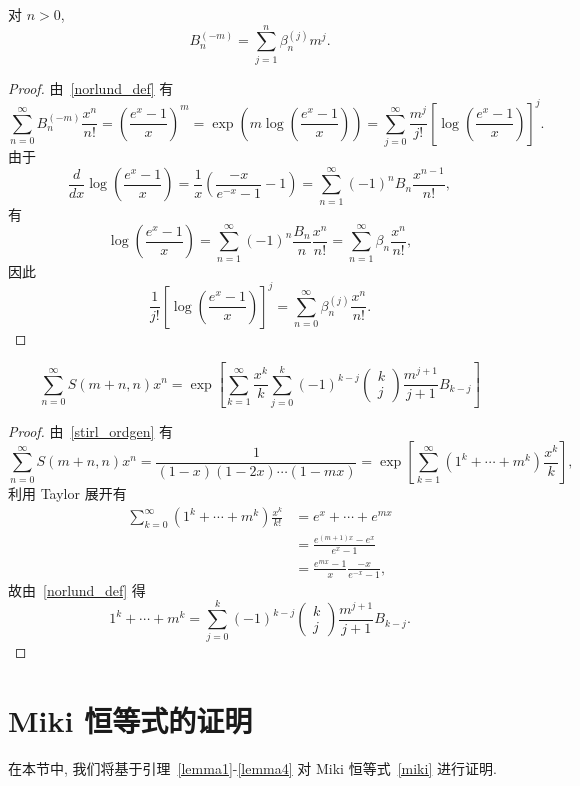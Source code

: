 \documentclass{CombPaper}
\begin{document}
\begin{lemma}\label{lemma3}
对 $n>0$, 
$$B_{n}^{(-m)}=\sum_{j=1}^{n} \beta_{n}^{(j)} m^{j}.$$
\end{lemma}
\begin{proof}
由~\eqref{norlund_def} 有
$$
\sum_{n=0}^{\infty} B_{n}^{(-m)} \frac{x^{n}}{n !}=\left(\frac{e^{x}-1}{x}\right)^{m}=\exp \left(m \log \left(\frac{e^{x}-1}{x}\right)\right)=\sum_{j=0}^{\infty} \frac{m^{j}}{j !}\left[\log \left(\frac{e^{x}-1}{x}\right)\right]^{j}.
$$
由于
$$
\frac{d}{d x} \log \left(\frac{e^{x}-1}{x}\right)=\frac{1}{x}\left(\frac{-x}{e^{-x}-1}-1\right)=\sum_{n=1}^{\infty}(-1)^{n} B_{n} \frac{x^{n-1}}{n !}, 
$$
有
$$
\log \left(\frac{e^{x}-1}{x}\right)=\sum_{n=1}^{\infty}(-1)^{n} \frac{B_{n}}{n} \frac{x^{n}}{n !}=\sum_{n=1}^{\infty} \beta_{n} \frac{x^{n}}{n !}, 
$$
因此
$$
\frac{1}{j !}\left[\log \left(\frac{e^{x}-1}{x}\right)\right]^{j}=\sum_{n=0}^{\infty} \beta_{n}^{(j)} \frac{x^{n}}{n !}.
$$
\end{proof}

\begin{lemma}\label{lemma4}
$$
\sum_{n=0}^{\infty} S(m+n,  n) x^{n}=\exp \left[\sum_{k=1}^{\infty} \frac{x^{k}}{k} \sum_{j=0}^{k}(-1)^{k-j}\left(\begin{array}{c}
k \\
j
\end{array}\right) \frac{m^{j+1}}{j+1} B_{k-j}\right]
$$
\end{lemma}
\begin{proof}
由~\eqref{stirl_ordgen} 有
$$
\sum_{n=0}^{\infty} S(m+n,  n) x^{n}=\frac{1}{(1-x)(1-2 x) \cdots(1-m x)}=\exp \left[\sum_{k=1}^{\infty}\left(1^{k}+\cdots+m^{k}\right) \frac{x^{k}}{k}\right], 
$$
利用 Taylor 展开有
$$
\begin{aligned}
\sum_{k=0}^{\infty}\left(1^{k}+\cdots+m^{k}\right) \frac{x^{k}}{k !} &=e^{x}+\cdots+e^{m x} \\
&=\frac{e^{(m+1) x}-e^{x}}{e^{x}-1}\\
&=\frac{e^{m x}-1}{x} \frac{-x}{e^{-x}-1}, 
\end{aligned}
$$
故由~\eqref{norlund_def} 得 $$
1^{k}+\cdots+m^{k}=\sum_{j=0}^{k}(-1)^{k-j}\left(\begin{array}{c}
k \\
j
\end{array}\right) \frac{m^{j+1}}{j+1} B_{k-j}.
$$
\end{proof}

\section{ Miki 恒等式的证明}\label{sec3}
在本节中, 我们将基于引理~\ref{lemma1}-\ref{lemma4} 对 Miki 恒等式~\eqref{miki} 进行证明.
\end{document}
